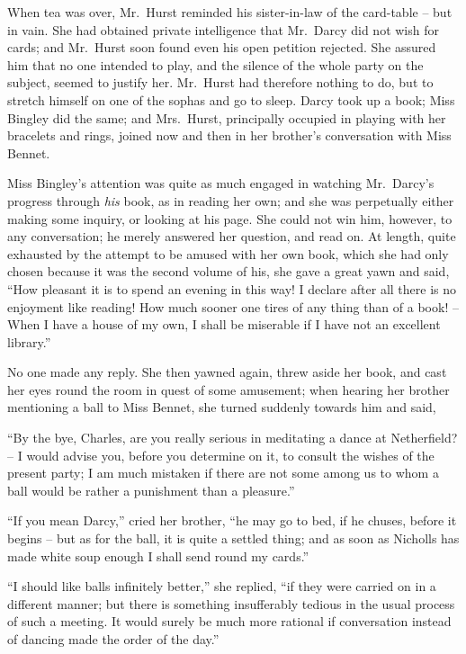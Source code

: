 When tea was over, Mr.\ Hurst reminded his sister-in-law
of the card-table -- but in vain. She had obtained
private intelligence that Mr.\ Darcy did not wish for cards;
and Mr.\ Hurst soon found even his open petition rejected.
She assured him that no one intended to play, and the
silence of the whole party on the subject, seemed to justify
her. Mr.\ Hurst had therefore nothing to do, but to stretch
himself on one of the sophas and go to sleep. Darcy took
up a book; Miss Bingley did the same; and Mrs.\ Hurst,
principally occupied in playing with her bracelets and rings,
joined now and then in her brother’s conversation with
Miss Bennet.

Miss Bingley’s attention was quite as much engaged in
watching Mr.\ Darcy’s progress through \textit{his} book, as in
reading her own; and she was perpetually either making
some inquiry, or looking at his page. She could not win
him, however, to any conversation; he merely answered
her question, and read on. At length, quite exhausted
by the attempt to be amused with her own book, which
she had only chosen because it was the second volume
of his, she gave a great yawn and said, “How pleasant
it is to spend an evening in this way! I declare after all
there is no enjoyment like reading! How much sooner
one tires of any thing than of a book! -- When I have
a house of my own, I shall be miserable if I have not an
excellent library.”

No one made any reply. She then yawned again, threw
aside her book, and cast her eyes round the room in
quest of some amusement; when hearing her brother
mentioning a ball to Miss Bennet, she turned suddenly
towards him and said,

“By the bye, Charles, are you really serious in meditating
a dance at Netherfield? -- I would advise you, before
you determine on it, to consult the wishes of the present
party; I am much mistaken if there are not some among
us to whom a ball would be rather a punishment than
a pleasure.”

“If you mean Darcy,” cried her brother, “he may go
to bed, if he chuses, before it begins -- but as for the ball,
it is quite a settled thing; and as soon as Nicholls has
made white soup enough I shall send round my cards.”

“I should like balls infinitely better,” she replied, “if
they were carried on in a different manner; but there is
something insufferably tedious in the usual process of
such a meeting. It would surely be much more rational
if conversation instead of dancing made the order of
the day.”

